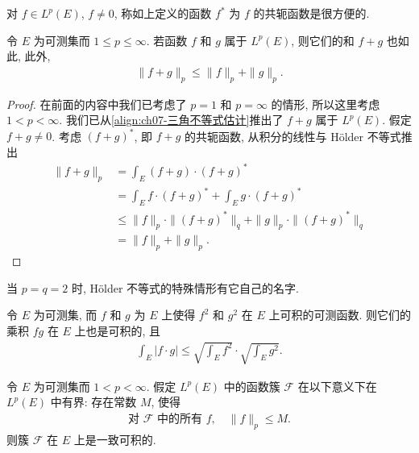 \documentclass[../../main.tex]{subfiles}
\begin{document}
对 $f\in L^{p}(E)$, $f\neq 0$, 称如上定义的函数 $f^{*}$ 为 $f$ 的共轭函数是很方便的.

\begin{theorem}\label{theorem:ch07-Minkowski}
令 $E$ 为可测集而 $1\leqslant p\leqslant\infty$. 若函数 $f$ 和 $g$ 属于 $L^{p}(E)$, 则它们的和 $f+g$ 也如此, 此外,
\begin{align*}
\|f+g\|_{p}\leqslant\|f\|_{p}+\|g\|_{p}.
\end{align*}
\end{theorem}

\begin{proof}
在前面的内容中我们已考虑了 $p=1$ 和 $p=\infty$ 的情形, 所以这里考虑 $1<p<\infty$. 我们已从\eqref{align:ch07-三角不等式估计}推出了 $f+g$ 属于 $L^{p}(E)$. 假定 $f+g\neq 0$. 考虑 $(f+g)^{*}$, 即 $f+g$ 的共轭函数, 从积分的线性与 H\"older 不等式推出
\begin{align*}
\|f+g\|_{p}&=\int_{E}(f+g)\cdot(f+g)^{*}\\
&=\int_{E}f\cdot(f+g)^{*}+\int_{E}g\cdot(f+g)^{*}\\
&\leqslant\|f\|_{p}\cdot\|(f+g)^{*}\|_{q}+\|g\|_{p}\cdot\|(f+g)^{*}\|_{q}\\
&=\|f\|_{p}+\|g\|_{p}.
\end{align*}
\end{proof}

当 $p=q=2$ 时, H\"older 不等式的特殊情形有它自己的名字.

\begin{corollary}\label{corollary:ch07-Cauchy-Schwarz}
令 $E$ 为可测集, 而 $f$ 和 $g$ 为 $E$ 上使得 $f^{2}$ 和 $g^{2}$ 在 $E$ 上可积的可测函数. 则它们的乘积 $fg$ 在 $E$ 上也是可积的, 且
\begin{align*}
\int_{E}|f\cdot g|\leqslant\sqrt{\int_{E}f^{2}}\cdot\sqrt{\int_{E}g^{2}}.
\end{align*}
\end{corollary}

\begin{corollary}\label{corollary:ch07-一致可积}
令 $E$ 为可测集而 $1<p<\infty$. 假定 $L^{p}(E)$ 中的函数簇 $\mathcal{F}$ 在以下意义下在 $L^{p}(E)$ 中有界: 存在常数 $M$, 使得
\begin{align*}
\text{对 }\mathcal{F}\text{ 中的所有 }f,\quad\|f\|_{p}\leqslant M.
\end{align*}
则簇 $\mathcal{F}$ 在 $E$ 上是一致可积的.
\end{corollary}
\end{document}
